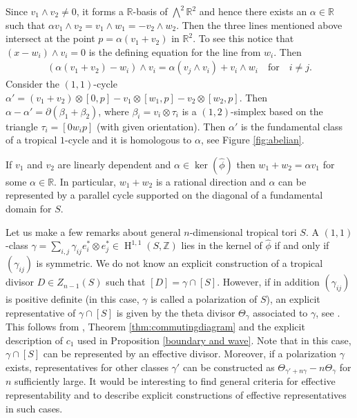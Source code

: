 \documentclass[11pt]{article}
\numberwithin{equation}{numsection}
\newcommand{\Z}{{\mathbb Z}}
\newcommand{\R}{{\mathbb R}}
\newcommand{\phihat}{\hat{\phi}}
\DeclareMathOperator{\HH}{H}
\begin{document}
Since $v_1 \wedge v_2 \neq 0$, it forms  a $\R$-basis of $\bigwedge^2 \R^2$
and hence there exists an $\alpha \in \R$ such that $\alpha v_1 \wedge v_2 = v_1 \wedge w_1 = - v_2 \wedge w_2$. 
Then the  three lines mentioned above intersect at the point $p = \alpha ( v_1 + v_2)$ in $\R^2$. 
To see this notice that $ (x - w_i) \wedge v_i = 0$ is the defining equation for the line from $w_i$. 
Then 
\begin{align*}
  (\alpha (v_1 + v_2)  - w_i) \wedge v_i = \alpha(v_j \wedge v_i) + v_i \wedge w_i \quad \text{for} \quad i \neq j.
\end{align*}
Consider the  $(1,1)$-cycle $\alpha'  = (v_1 + v_2) \otimes [0,p] - v_1 \otimes [w_1, p] - v_2 \otimes [w_2,p]$.
Then $\alpha - \alpha' = \partial(\beta_1 + \beta_2)$, where 
$\beta_i =  v_i \otimes \tau_i$ is a $(1, 2)$-simplex based on the triangle $\tau_i = [0 w_i p]$
(with given orientation).
Then  $\alpha'$ is the fundamental class of a tropical $1$-cycle and it is homologous to $\alpha$, see Figure \ref{fig:abelian}.  


If $v_1$ and $v_2$ are linearly dependent and $\alpha \in \ker(\hat \phi)$ then $w_1 + w_2 = \alpha v_1$ for some $\alpha \in \R$. 
In particular, $w_1 + w_2$ is a rational direction and 
$\alpha$ can be represented by a parallel cycle supported on the diagonal of a  fundamental domain for $S$.

Let us make a few remarks about general $n$-dimensional tropical tori $S$. A $(1,1)$-class $\gamma = \sum_{i,j} \gamma_{ij} e_i^* \otimes e_j^*
\in \HH^{1, 1}(S, \Z)$ lies in the kernel of $\phihat$ if and only if $(\gamma_{ij})$ is symmetric. We do not know an explicit
construction of a tropical divisor $D \in Z_{n-1}(S)$ such that $[D] = \gamma \cap [S]$. 
However, if in addition $(\gamma_{ij})$ is positive definite (in this case, $\gamma$ is called a polarization of $S$), 
an explicit representative of $\gamma \cap [S]$ is given by the theta divisor $\Theta_\gamma$ associated to $\gamma$, 
see \cite{MikZha:Theta}. 
This follows from \cite[Lemma 5.2]{MikZha:Theta}, Theorem \ref{thm:commutingdiagram}
and the explicit description of $c_1$ used in Proposition \ref{boundary and wave}.
Note that in this case, $\gamma \cap [S]$ can be represented by an effective divisor. 
Moreover, if a polarization $\gamma$ exists, 
representatives for other classes $\gamma'$ can be constructed
as $\Theta_{\gamma' + n \gamma} - n \Theta_\gamma$ for $n$ sufficiently large. 
It would be interesting to find general criteria for effective representability and to describe 
explicit constructions of effective representatives in such cases. 
\end{document}
